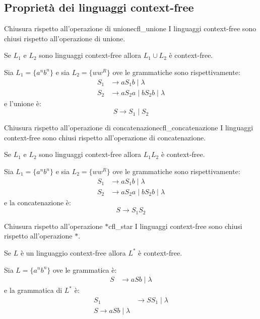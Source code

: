 \documentclass[12pt]{report}
\newcounter{theorem}
\newcommand{\nmu}{}
\begin{document}
\subsection{Proprietà dei linguaggi context-free}
\begin{theorem}{\nmu Chiusura rispetto all'operazione di unione}{cfl_unione}
	I linguaggi context-free sono chiusi rispetto all'operazione di unione.
\end{theorem}
Se $L_1$ e $L_2$ sono linguaggi context-free allora $L_1 \cup L_2$ è context-free.
\begin{example}{}{}
Sia $L_1 = \{a^nb^n\}$ e sia $L_2 = \{ww^R\}$ ove le grammatiche sono rispettivamente:
\begin{align*}
	S_1 &\to aS_1b \mid \lambda \\
	S_2 &\to aS_2a \mid bS_2b \mid \lambda
\end{align*}
e l'unione è:
\[
S \to S_1 \mid S_2
\]
\end{example}
\begin{theorem}{\nmu Chiusura rispetto all'operazione di concatenazione}{cfl_concatenazione}
	I linguaggi context-free sono chiusi rispetto all'operazione di concatenazione.
\end{theorem}
Se $L_1$ e $L_2$ sono linguaggi context-free allora $L_1L_2$ è context-free.
\begin{example}{}{}
Sia $L_1 = \{a^nb^n\}$ e sia $L_2 = \{ww^R\}$ ove le grammatiche sono rispettivamente:
\begin{align*}
	S_1 &\to aS_1b \mid \lambda \\
	S_2 &\to aS_2a \mid bS_2b \mid \lambda
\end{align*}
e la concatenazione è:
\[
S \to S_1S_2
\]
\end{example}
\begin{theorem}{\nmu Chiusura rispetto all'operazione $*$}{cfl_star}
	I linguaggi context-free sono chiusi rispetto all'operazione $*$.
\end{theorem}
Se $L$ è un linguaggio context-free allora $L^*$ è context-free.
\begin{example}{}{}
Sia $L = \{a^nb^n\}$ ove le grammatica è:
\begin{align*}
	S &\to aSb \mid \lambda
\end{align*}
e la grammatica di $L^*$ è:
\begin{align*}
S_1 &\to SS_1 \mid \lambda \\
S \to aSb \mid \lambda
\end{align*}
\end{example}
\end{document}
